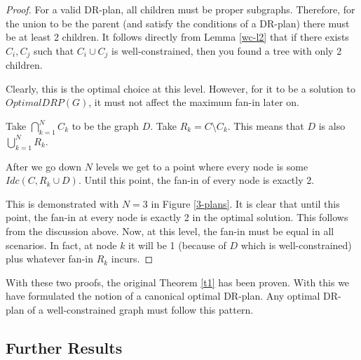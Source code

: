 \begin{proof}
For a valid DR-plan, all children must be proper subgraphs. Therefore, for the union to be the parent (and satisfy the conditions of a DR-plan) there must be at least 2 children. It follows directly from Lemma \ref{wc-l2} that if there exists $C_i, C_j$ such that $C_i \cup C_j$ is well-constrained, then you found a tree with only 2 children.

Clearly, this is the optimal choice at this level. However, for it to be a solution to $OptimalDRP(G)$, it must not affect the maximum fan-in later on.

Take $\bigcap_{k=1}^N{C_k}$ to be the graph $D$. Take $R_k=C\setminus C_k$. This means that $D$ is also $\bigcup_{k=1}^N{R_k}$.

After we go down $N$ levels we get to a point where every node is some $Idc(C,R_k\cup D)$. Until this point, the fan-in of every node is exactly 2.

This is demonstrated with $N=3$ in Figure \ref{3-plans}. It is clear that until this point, the fan-in at every node is exactly 2 in the optimal solution. This follows from the discussion above. Now, at this level, the fan-in must be equal in all scenarios. In fact, at node $k$ it will be 1 (because of $D$ which is well-constrained) plus whatever fan-in $R_k$ incurs.
\end{proof}

With these two proofs, the original Theorem \ref{t1} has been proven. With this we have formulated the notion of a canonical optimal DR-plan. Any optimal DR-plan of a well-constrained graph must follow this pattern.






\subsection{Further Results}


